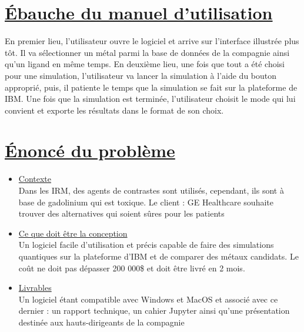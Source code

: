 \documentclass[11pt]{article}
\begin{document}
\section{\underline{Ébauche du manuel d'utilisation}}
En premier lieu, l'utilisateur ouvre le logiciel et arrive sur l'interface illustrée plus tôt. Il va sélectionner un métal parmi la base de données de la compagnie ainsi qu'un ligand en même temps. En deuxième lieu, une fois que tout a été choisi pour une simulation, l'utilisateur va lancer la simulation à l'aide du bouton approprié, puis, il patiente le temps que la simulation se fait sur la plateforme de IBM. Une fois que la simulation est terminée, l'utilisateur choisit le mode qui lui convient et exporte les résultats dans le format de son choix.


\section{\underline{Énoncé du problème}}

\begin{itemize}
  \item \underline{Contexte}\\Dans les IRM, des agents de contrastes sont utilisés, cependant, ils sont à base de gadolinium qui est toxique. Le client : GE Healthcare souhaite trouver des alternatives qui soient sûres pour les patients
  \item \underline{Ce que doit être la conception}\\Un logiciel facile d'utilisation et précis capable de faire des simulations quantiques sur la plateforme d'IBM et de comparer des métaux candidats. Le coût ne doit pas dépasser 200 000\$ et doit être livré en 2 mois.
  \item \underline{Livrables}\\Un logiciel étant compatible avec Windows et MacOS et associé avec ce dernier : un rapport technique, un cahier Jupyter ainsi qu'une présentation destinée aux hauts-dirigeants de la compagnie
\end{itemize}
\end{document}
